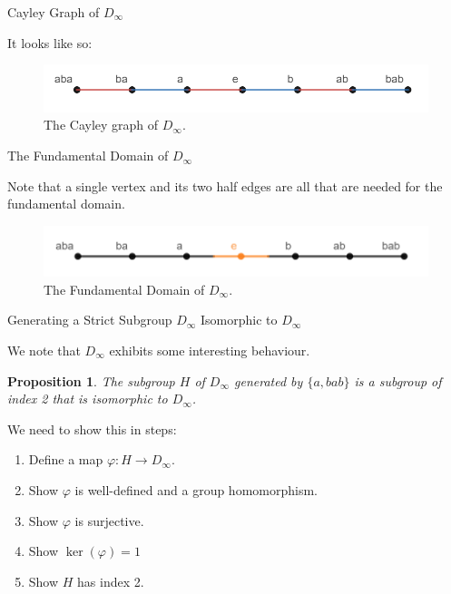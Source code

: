 \documentclass[usenames,dvipsnames]{beamer}
\newtheorem{proposition}{Proposition}
\begin{document}
\begin{frame}{Cayley Graph of $D_\infty$}

It looks like so:

\begin{figure}[h]
    \centering
    \includegraphics[width=1\textwidth]{images/2-01-Cayley_Graph.png}
    \caption{The Cayley graph of $D_\infty$.}
\end{figure}

\end{frame}

\begin{frame}{The Fundamental Domain of $D_\infty$}

Note that a single vertex and its two half edges are all that are needed for the fundamental domain.
\begin{figure}[h]
    \centering
    \includegraphics[width=1\textwidth]{images/2-01-01-Fundamental_Domain.png}
    \caption{The Fundamental Domain of $D_\infty$.}
\end{figure}

\end{frame}

\begin{frame}{Generating a Strict Subgroup $D_\infty$ Isomorphic to $D_\infty$}

We note that $D_\infty$ exhibits some interesting behaviour.

\begin{proposition}

The subgroup $H$ of $D_\infty$ generated by $\{a,bab\}$ is a subgroup of index 2 that is isomorphic to
$D_\infty$.

\end{proposition}

We need to show this in steps:

\begin{enumerate}
  \item Define a map $\varphi:H\rightarrow D_{\infty}$. 
  \item Show $\varphi$ is well-defined and a group homomorphism.
  \item Show $\varphi$ is surjective.
  \item Show $\ker(\varphi)={1}$
  \item Show $H$ has index 2.
\end{enumerate}

\end{frame}
\end{document}
